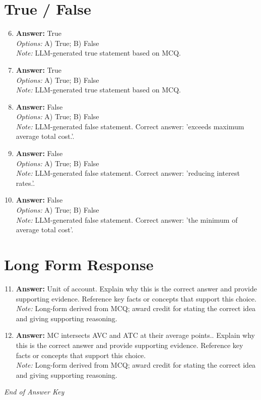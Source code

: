\documentclass[12pt]{article}
\begin{document}
\section*{True / False}
\begin{enumerate}[label=\arabic*.]
\setcounter{enumi}{5}
\item \textbf{Answer:} True
\\ \textit{Options:} A) True; B) False
\\ \textit{Note:} LLM-generated true statement based on MCQ.
\item \textbf{Answer:} True
\\ \textit{Options:} A) True; B) False
\\ \textit{Note:} LLM-generated true statement based on MCQ.
\item \textbf{Answer:} False
\\ \textit{Options:} A) True; B) False
\\ \textit{Note:} LLM-generated false statement. Correct answer: 'exceeds maximum average total cost.'.
\item \textbf{Answer:} False
\\ \textit{Options:} A) True; B) False
\\ \textit{Note:} LLM-generated false statement. Correct answer: 'reducing interest rates.'.
\item \textbf{Answer:} False
\\ \textit{Options:} A) True; B) False
\\ \textit{Note:} LLM-generated false statement. Correct answer: 'the minimum of average total cost'.
\end{enumerate}

\section*{Long Form Response}
\begin{enumerate}[label=\arabic*.]
\setcounter{enumi}{10}
\item \textbf{Answer:} Unit of account. Explain why this is the correct answer and provide supporting evidence. Reference key facts or concepts that support this choice.
\\ \textit{Note:} Long-form derived from MCQ; award credit for stating the correct idea and giving supporting reasoning.
\item \textbf{Answer:} MC intersects AVC and ATC at their average points.. Explain why this is the correct answer and provide supporting evidence. Reference key facts or concepts that support this choice.
\\ \textit{Note:} Long-form derived from MCQ; award credit for stating the correct idea and giving supporting reasoning.
\end{enumerate}

\vfill
\noindent\textit{End of Answer Key}
\end{document}
